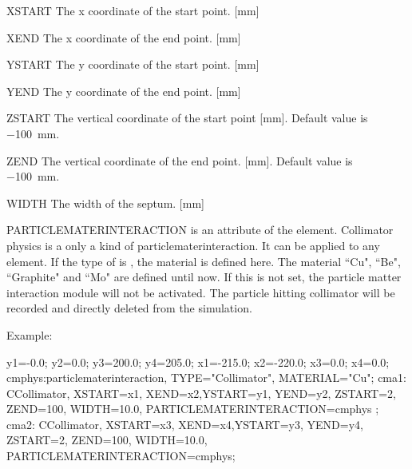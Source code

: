 \begin{kdescription}
\item[XSTART]
The x coordinate of the start point. [\si{\milli\meter}]
 \item[XEND]
The x coordinate of the end point. [\si{\milli\meter}]
\item[YSTART]
The y coordinate of the start point. [\si{\milli\meter}]
 \item[YEND]
The y coordinate of the end point. [\si{\milli\meter}]
\item[ZSTART]
The vertical coordinate of the start point [\si{\milli\meter}]. Default value is \SI{-100}{\milli\meter}.
 \item[ZEND]
The vertical coordinate of the end point. [\si{\milli\meter}]. Default value is \SI{-100}{\milli\meter}.
\item[WIDTH]
The width of the septum. [\si{\milli\meter}]
 \item[PARTICLEMATERINTERACTION]
 is an attribute of the element. Collimator physics is a only a kind of particlematerinteraction.
 It can be applied to any element. If the type of  is , the material is defined here.
 The material ``Cu", ``Be", ``Graphite" and ``Mo" are defined until now.
 If this is not set, the particle matter interaction module will not be activated.
 The particle hitting collimator will be recorded and directly deleted from the simulation.
\end{kdescription}



\noindent Example:
\begin{example}
y1=-0.0;
y2=0.0;
y3=200.0;
y4=205.0;
x1=-215.0;
x2=-220.0;
x3=0.0;
x4=0.0;
cmphys:particlematerinteraction, TYPE="Collimator", MATERIAL="Cu";
cma1: CCollimator, XSTART=x1, XEND=x2,YSTART=y1, YEND=y2,
ZSTART=2, ZEND=100, WIDTH=10.0, PARTICLEMATERINTERACTION=cmphys ;
cma2: CCollimator, XSTART=x3, XEND=x4,YSTART=y3, YEND=y4,
 ZSTART=2, ZEND=100, WIDTH=10.0, PARTICLEMATERINTERACTION=cmphys;
\end{example}

